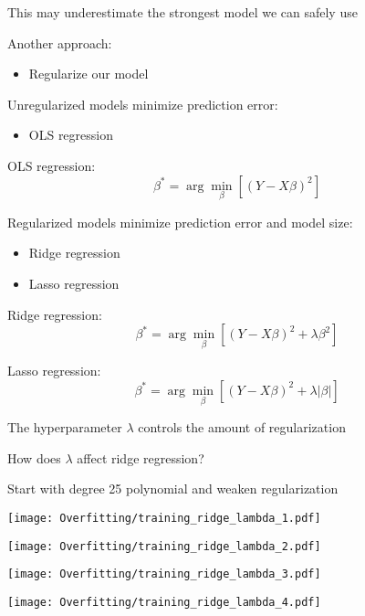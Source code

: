 \documentclass[xcolor=pdftex,dvipsnames,table]{beamer}
\begin{document}
\frame
{
	This may underestimate the strongest model we can safely use
}

\frame
{
	Another approach:
	\begin{itemize}
		\item{Regularize our model}
	\end{itemize}
}

\frame
{
	Unregularized models minimize prediction error:
	\begin{itemize}
		\item{OLS regression}
	\end{itemize}
}

\frame
{
	OLS regression:
	\[
		\beta ^ {*} =  \arg \min_{\beta} [(Y - X \beta) ^ 2]
	\]
}

\frame
{
	Regularized models minimize prediction error and model size:
	\begin{itemize}
		\item{Ridge regression}
		\item{Lasso regression}
	\end{itemize}
}

\frame
{
	Ridge regression:
	\[
		\beta ^ {*} =  \arg \min_{\beta} [(Y - X \beta) ^ 2 + \lambda \beta ^ 2]
	\]
}

\frame
{
	Lasso regression:
	\[
		\beta ^ {*} =  \arg \min_{\beta} [(Y - X \beta) ^ 2 + \lambda |\beta|]
	\]
}

\frame
{
	The hyperparameter $\lambda$ controls the amount of regularization
}

\frame
{
	How does $\lambda$ affect ridge regression?
}

\frame
{
	Start with degree 25 polynomial and weaken regularization
}

\frame
{
	\begin{center}
		\texttt{[image: Overfitting/training\_ridge\_lambda\_1.pdf]}
	\end{center}
}

\frame
{
	\begin{center}
		\texttt{[image: Overfitting/training\_ridge\_lambda\_2.pdf]}
	\end{center}
}

\frame
{
	\begin{center}
		\texttt{[image: Overfitting/training\_ridge\_lambda\_3.pdf]}
	\end{center}
}

\frame
{
	\begin{center}
		\texttt{[image: Overfitting/training\_ridge\_lambda\_4.pdf]}
	\end{center}
}
\end{document}
